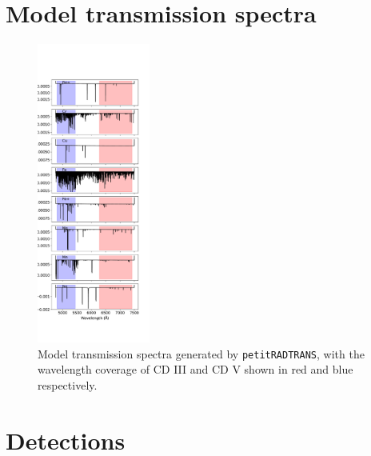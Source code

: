 \documentclass[twocolumn]{aastex631}
\newcommand{\code}[1]{\texttt{#1}}
\begin{document}
    \section{Model transmission spectra}\label{app:Model transmission spectra}
    \begin{figure}
        \label{fig:model-spectra-appendix}
        \includegraphics[width=0.33\textwidth]{plots/spectra/spectra.KELT-20b.inverted-transmission-better.pdf}
    \caption{Model transmission spectra generated by \code{petitRADTRANS}, with the wavelength coverage of CD III and CD V shown in red and blue respectively.}
            
        \end{figure}    


   \section{Detections}\label{app:Detections}
\end{document}
